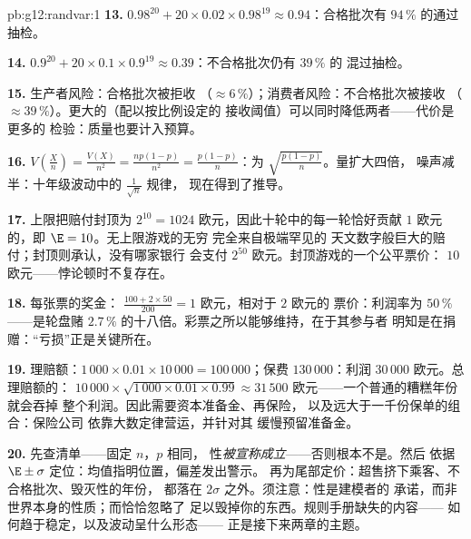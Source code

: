 \begin{solution}{pb:g12:randvar:1}
\textbf{13.} $0.98^{20} + 20 \times 0.02 \times 0.98^{19}
\approx 0.94$：合格批次有 $94\,\%$ 的通过抽检。

\textbf{14.} $0.9^{20} + 20 \times 0.1 \times 0.9^{19}
\approx 0.39$：不合格批次仍有 $39\,\%$ 的
混过抽检。

\textbf{15.} 生产者风险：合格批次被拒收
（$\approx 6\,\%$）；消费者风险：不合格批次被接收
（$\approx 39\,\%$）。更大的（配以按比例设定的
接收阈值）可以同时降低两者——代价是更多的
检验：质量也要计入预算。

\textbf{16.} $V\!\left(\frac Xn\right) = \frac{V(X)}{n^2} =
\frac{np(1-p)}{n^2} = \frac{p(1-p)}{n}$：为
$\sqrt{\frac{p(1-p)}{n}}$。量扩大四倍，
噪声减半：十年级波动中的 $\frac{1}{\sqrt n}$ 规律，
现在得到了推导。

\textbf{17.} 上限把赔付封顶为 $2^{10} = 1024$
欧元，因此十轮中的每一轮恰好贡献 $1$ 欧元
的，即 $\E = 10$。无上限游戏的无穷
完全来自极端罕见的
天文数字般巨大的赔付；封顶则承认，没有哪家银行
会支付 $2^{50}$ 欧元。封顶游戏的一个公平票价：
$10$ 欧元——悖论顿时不复存在。

\textbf{18.} 每张票的奖金：
$\frac{100 + 2 \times 50}{200} = 1$ 欧元，相对于 $2$ 欧元的
票价：利润率为 $50\,\%$——是轮盘赌
$2.7\,\%$ 的十八倍。彩票之所以能够维持，在于其参与者
明知是在捐赠：“亏损”正是关键所在。

\textbf{19.} 理赔额：$1\,000 \times 0.01 \times
10\,000 = 100\,000$；保费 $130\,000$：利润
$30\,000$ 欧元。总理赔额的：
$10\,000 \times \sqrt{1\,000 \times 0.01 \times 0.99}
\approx 31\,500$ 欧元——一个普通的糟糕年份就会吞掉
整个利润。因此需要资本准备金、再保险，
以及远大于一千份保单的组合：保险公司
依靠大数定律营运，并针对其
缓慢预留准备金。

\textbf{20.} 先查清单——固定 $n$，$p$ 相同，
性\emph{被宣称成立}——否则根本不是。然后
依据 $\E \pm \sigma$ 定位：均值指明位置，偏差发出警示。
再为尾部定价：超售挤下乘客、不合格批次、毁灭性的年份，
都落在 $2\sigma$ 之外。须注意：性是建模者的
承诺，而非世界本身的性质；而恰恰忽略了
足以毁掉你的东西。规则手册缺失的内容——
如何趋于稳定，以及波动呈什么形态——
正是接下来两章的主题。
\end{solution}
